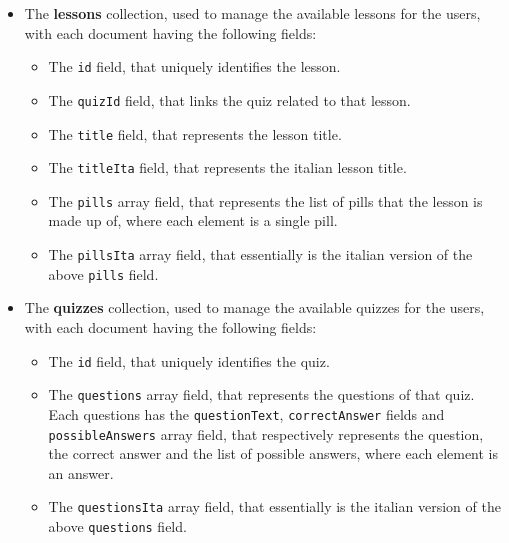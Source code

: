 \begin{itemize}[nosep] %
    \item The \textbf{lessons} collection, used to manage the available lessons for the users, with each document having the following fields:
    \begin{itemize}[nosep]
        \item The \texttt{id} field, that uniquely identifies the lesson.
        \item The \texttt{quizId} field, that links the quiz related to that lesson.
        \item The \texttt{title} field, that represents the lesson title.
        \item The \texttt{titleIta} field, that represents the italian lesson title.
        \item The \texttt{pills} array field, that represents the list of pills that the lesson is made up of, where each element is a single pill.
        \item The \texttt{pillsIta} array field, that essentially is the italian version of the above \texttt{pills} field.
    \end{itemize}
\end{itemize}
\newpage
\begin{itemize}[nosep] %
    \item The \textbf{quizzes} collection, used to manage the available quizzes for the users, with each document having the following fields:
    \begin{itemize}[nosep]
        \item The \texttt{id} field, that uniquely identifies the quiz.
        \item The \texttt{questions} array field, that represents the questions of that quiz. Each questions has the \texttt{questionText}, \texttt{correctAnswer} fields and \texttt{possibleAnswers} array field, that respectively represents the question, the correct answer and the list of possible answers, where each element is an answer.
        \item The \texttt{questionsIta} array field, that essentially is the italian version of the above \texttt{questions} field.
    \end{itemize}
\end{itemize}


